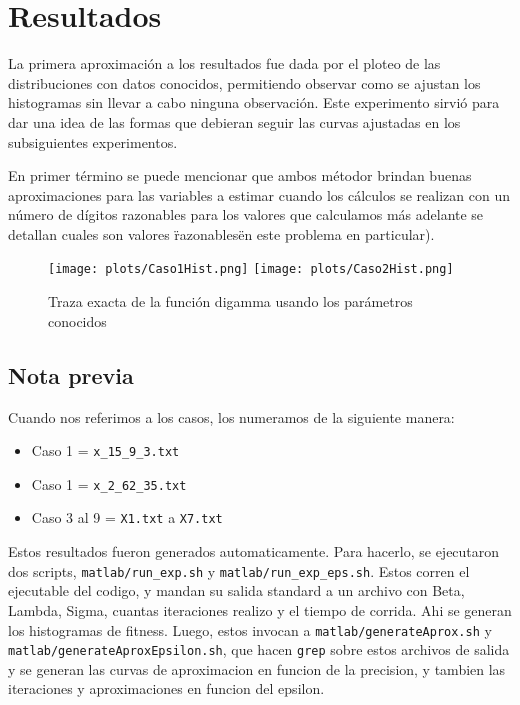\section{Resultados}

La primera aproximaci\'on a los resultados fue dada por el ploteo de las 
distribuciones con datos conocidos, permitiendo observar como se ajustan los 
histogramas sin llevar a cabo ninguna observaci\'on. 
Este experimento sirvi\'o para dar una idea de las formas que debieran seguir 
las curvas ajustadas en los subsiguientes experimentos.

En primer t\'ermino se puede mencionar que ambos m\'etodor brindan buenas
aproximaciones para las variables a estimar cuando los c\'alculos se realizan
con un n\'umero de d\'igitos razonables para los valores que calculamos m\'as
adelante se detallan cuales son valores \"razonables\" en este problema en
particular).
\begin{figure} [H]
\begin {center}
\texttt{[image: plots/Caso1Hist.png]}
\texttt{[image: plots/Caso2Hist.png]}
\end {center}
\caption{Traza exacta de la funci\'on digamma usando los par\'ametros conocidos}
\label{fig:FitCaso1Y2Newton}
\end{figure}

\subsection{Nota previa}
Cuando nos referimos a los casos, los numeramos de la siguiente manera:\\
\begin{itemize}
    \item Caso 1 = \texttt{x\_15\_9\_3.txt}
    \item Caso 1 = \texttt{x\_2\_62\_35.txt}
    \item Caso 3 al 9 = \texttt{X1.txt} a \texttt{X7.txt}
\end{itemize}

Estos resultados fueron generados automaticamente. Para hacerlo, se ejecutaron
dos scripts, \texttt{matlab/run\_exp.sh} y \texttt{matlab/run\_exp\_eps.sh}.
Estos corren el ejecutable del codigo, y mandan su salida standard a un archivo
con Beta, Lambda, Sigma, cuantas iteraciones realizo y el tiempo de corrida. Ahi se generan
los histogramas de fitness. Luego, estos invocan a \texttt{matlab/generateAprox.sh} y 
\texttt{matlab/generateAproxEpsilon.sh}, que hacen \texttt{grep} sobre estos archivos de
salida y se generan las curvas de aproximacion en funcion de la precision, y tambien
las iteraciones y aproximaciones en funcion del epsilon. \\

